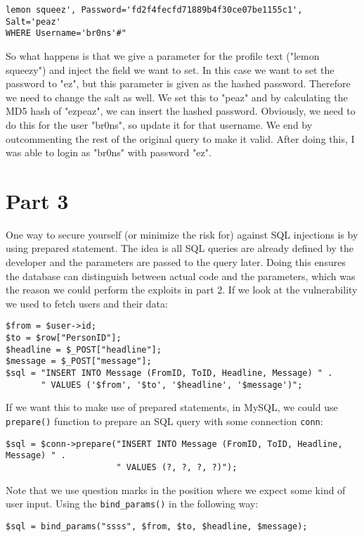 \documentclass[a4paper]{article}
\begin{document}
\begin{lstlisting}
lemon squeez', Password='fd2f4fecfd71889b4f30ce07be1155c1', Salt='peaz'
WHERE Username='br0ns'#"
\end{lstlisting}
So what happens is that we give a parameter for the profile text ("lemon squeezy") and inject the field we want to set. In this case we want to set the password to "ez", but this parameter is given as the hashed password. Therefore we need to change the salt as well. We set this to "peaz" and by calculating the MD5 hash of "ezpeaz", we can insert the hashed password. Obviously, we need to do this for the user "br0ns", so update it for that username. We end by outcommenting the rest of the original query to make it valid. After doing this, I was able to login as "br0ns" with password "ez".

\section{Part 3}
One way to secure yourself (or minimize the risk for) against SQL injections is by using prepared statement. The idea is all SQL queries are already defined by the developer and the parameters are passed to the query later. Doing this ensures the database can distinguish between actual code and the parameters, which was the reason we could perform the exploits in part $2$. If we look at the vulnerability we used to fetch users and their data: \\
\begin{lstlisting}
$from = $user->id;
$to = $row["PersonID"];
$headline = $_POST["headline"];
$message = $_POST["message"];
$sql = "INSERT INTO Message (FromID, ToID, Headline, Message) " .
       " VALUES ('$from', '$to', '$headline', '$message')";
\end{lstlisting}
If we want this to make use of prepared statements, in MySQL, we could use \texttt{prepare()} function to prepare an SQL query with some connection \texttt{conn}: \\
\begin{lstlisting}
$sql = $conn->prepare("INSERT INTO Message (FromID, ToID, Headline, Message) " .
                      " VALUES (?, ?, ?, ?)");
\end{lstlisting}
Note that we use question marks in the position where we expect some kind of user input. Using the \texttt{bind\_params()} in the following way: \\
\begin{lstlisting}
$sql = bind_params("ssss", $from, $to, $headline, $message);
\end{lstlisting}
\end{document}
